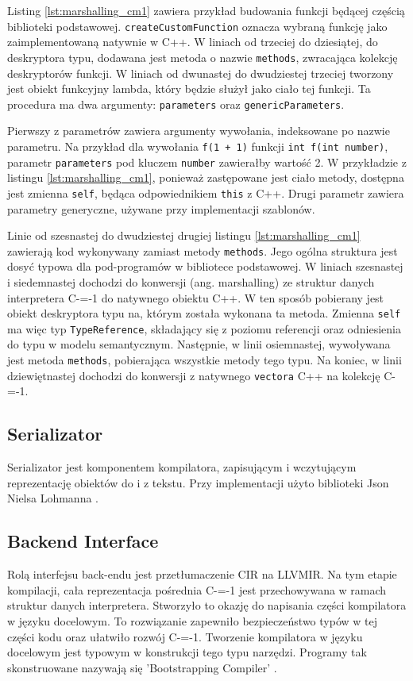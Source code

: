 Listing \ref{lst:marshalling_cm1} zawiera przykład budowania funkcji będącej częścią biblioteki podstawowej.
\lstinline{createCustomFunction} oznacza wybraną  funkcję jako zaimplementowaną natywnie w C++.
W liniach od trzeciej do dziesiątej, do deskryptora typu, dodawana jest metoda o nazwie \lstinline{methods}, zwracająca kolekcję deskryptorów funkcji.
W liniach od dwunastej do dwudziestej trzeciej tworzony jest obiekt funkcyjny lambda, który będzie służył jako ciało tej funkcji.
Ta procedura ma dwa argumenty: \lstinline{parameters} oraz \lstinline{genericParameters}.

Pierwszy z parametrów zawiera argumenty wywołania, indeksowane po nazwie parametru.
Na przykład dla wywołania \lstinline{f(1 + 1)} funkcji \lstinline{int f(int number)}, parametr \lstinline{parameters} pod kluczem \lstinline{number} zawierałby wartość 2.
W przykładzie z listingu \ref{lst:marshalling_cm1}, ponieważ zastępowane jest ciało metody, dostępna jest zmienna \lstinline{self}, będąca odpowiednikiem \lstinline{this} z C++.
Drugi parametr zawiera parametry generyczne, używane przy implementacji szablonów.

Linie od szesnastej do dwudziestej drugiej listingu \ref{lst:marshalling_cm1} zawierają kod wykonywany zamiast metody \lstinline{methods}.
Jego ogólna struktura jest dosyć typowa dla pod-programów w bibliotece podstawowej.
W liniach szesnastej i siedemnastej dochodzi do konwersji (ang. marshalling)\cite{wiki:Marshalling} ze struktur danych interpretera C-=-1 do natywnego obiektu C++.
W ten sposób pobierany jest obiekt deskryptora typu na, którym została wykonana ta metoda.
Zmienna \lstinline{self} ma więc typ \lstinline{TypeReference}, składający się z poziomu referencji oraz odniesienia do typu w modelu semantycznym.
Następnie, w linii osiemnastej, wywoływana jest metoda \lstinline{methods}, pobierająca wszystkie metody tego typu.
Na koniec, w linii dziewiętnastej dochodzi do konwersji z natywnego \lstinline{vectora} C++ na kolekcję C-=-1.


\subsection{Serializator}
\label{serializer}

Serializator jest komponentem kompilatora, zapisującym i wczytującym reprezentację obiektów do i z tekstu.
Przy implementacji użyto biblioteki Json Nielsa Lohmanna \cite{lohmann}.


\subsection{Backend Interface}
\label{Backend_Interface}
Rolą interfejsu back-endu jest przetłumaczenie CIR na LLVMIR.
Na tym etapie kompilacji, cała reprezentacja pośrednia C-=-1 jest przechowywana w ramach struktur danych interpretera.
Stworzyło to okazję do napisania części kompilatora w języku docelowym.
To rozwiązanie zapewniło bezpieczeństwo typów w tej części kodu oraz ułatwiło rozwój C-=-1.
Tworzenie kompilatora w języku docelowym jest typowym w konstrukcji tego typu narzędzi.
Programy tak skonstruowane nazywają się 'Bootstrapping Compiler' \cite{puntambekar:compiler_design}. 

